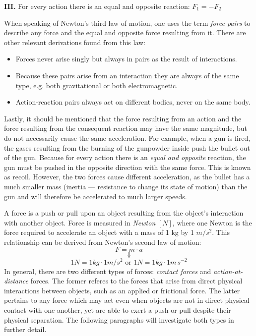 \begin{displayquote}
	\textbf{III.} For every action there is an equal and opposite reaction: $F_1 = -F_2$
\end{displayquote}

When speaking of Newton's third law of motion, one uses the term \emph{force pairs} to describe any force and the equal and opposite force resulting from it. There are other relevant derivations found from this law:

\begin{itemize}
	\item Forces never arise singly but always in pairs as the result of interactions.
	\item Because these pairs arise from an interaction they are always of the same type, e.g. both gravitational or both electromagnetic.
	\item Action-reaction pairs always act on different bodies, never on the same body.
\end{itemize}

Lastly, it should be mentioned that the force resulting from an action and the force resulting from the consequent reaction may have the same magnitude, but do not necessarily cause the same acceleration. For example, when a gun is fired, the gases resulting from the burning of the gunpowder inside push the bullet out of the gun. Because for every action there is an \emph{equal and opposite} reaction, the gun must be pushed in the opposite direction with the same force. This is known as recoil. However, the two forces cause different acceleration, as the bullet has a much smaller mass (inertia --- resistance to change its state of motion) than the gun and will therefore be accelerated to much larger speeds.


A force is a push or pull upon an object resulting from the object's interaction with another object. Force is measured in \emph{Newton} $[N]$, where one Newton is the force required to accelerate an object with a mass of 1 kg by 1 $m/s^2$. This relationship can be derived from Newton's second law of motion: $$F = m \cdot a$$ $$\Downarrow$$ $$ 1 N = 1 kg \cdot 1 m/s^2 \text{ or } 1 N = 1 kg \cdot 1 m\, s^{-2}$$ In general, there are two different types of forces: \emph{contact forces} and \emph{action-at-distance} forces. The former referes to the forces that arise from direct physical interactions between objects, such as an applied or frictional force. The latter pertains to any force which may act even when objects are not in direct physical contact with one another, yet are able to exert a push or pull despite their physical separation. The following paragraphs will investigate both types in further detail.

